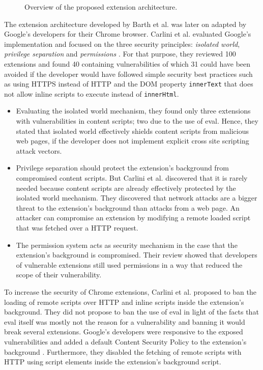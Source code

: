 	\begin{figure}[h]
		\centering
		\def\svgscale{0.8}
		
		\caption{Overview of the proposed extension architecture.}
		\label{fig:barthOverview}
	\end{figure}
	
	The extension architecture developed by Barth et al. was later on adapted by Google's developers for their Chrome browser. Carlini et al. evaluated Google's implementation and focused on the three security principles: \textit{isolated world}, \textit{privilege separation} and \textit{permissions} \cite{Carlini:2012:EGC:2362793.2362800}. For that purpose, they reviewed 100 extensions and found 40 containing vulnerabilities of which 31 could have been avoided if the developer would have followed simple security best practices such as using HTTPS instead of HTTP and the DOM property \texttt{innerText} that does not allow inline scripts to execute instead of \texttt{innerHtml}. 
	
	\begin{itemize}
		\item Evaluating the isolated world mechanism, they found only three extensions with vulnerabilities in content scripts; two due to the use of eval. Hence, they stated that isolated world effectively shields content scripts from malicious web pages, if the developer does not implement explicit cross site scripting attack vectors.
		
		\item Privilege separation should protect the extension's background from compromised content scripts. But Carlini et al. discovered that it is rarely needed because content scripts are already effectively protected by the isolated world mechanism. They discovered that network attacks are a bigger threat to the extension's background than attacks from a web page. An attacker can compromise an extension by modifying a remote loaded script that was fetched over a HTTP request. 
		
		\item The permission system acts as security mechanism in the case that the extension's background is compromised. Their review showed that developers of vulnerable extensions still used permissions in a way that reduced the scope of their vulnerability. 
	\end{itemize} 

	To increase the security of Chrome extensions, Carlini et al. proposed to ban the loading of remote scripts over HTTP and inline scripts inside the extension's background. They did not propose to ban the use of eval in light of the facts that eval itself was mostly not the reason for a vulnerability and banning it would break several extensions. Google's developers were responsive to the exposed vulnerabilities and added a default Content Security Policy to the extension's background \cite{chromiumBlogCSP}. Furthermore, they disabled the fetching of remote scripts with HTTP using script elements inside the extension's background script. 
 
